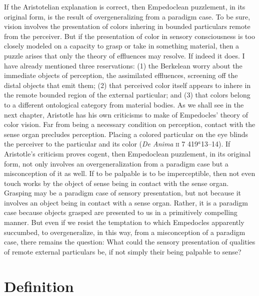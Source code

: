 If the Aristotelian explanation is correct, then Empedoclean puzzlement, in its original form, is the result of overgeneralizing from a paradigm case. To be sure, vision involves the presentation of colors inhering in bounded particulars remote from the perceiver. But if the presentation of color in sensory consciousness is too closely modeled on a capacity to grasp or take in something material, then a puzzle arises that only the theory of effluences may resolve. If indeed it does. I have already mentioned three reservations: (1) the Berkelean worry about the immediate objects of perception, the assimilated effluences, screening off the distal objects that emit them; (2) that perceived color itself appears to inhere in the remote bounded region of the external particular; and (3) that colors belong to a different ontological category from material bodies. As we shall see in the next chapter, Aristotle has his own criticisms to make of Empedocles' theory of color vision. Far from being a necessary condition on perception, contact with the sense organ precludes perception. Placing a colored particular on the eye blinds the perceiver to the particular and its color (\emph{De Anima} \textsc{ii} 7 419\( ^{a} \)13--14). If Aristotle's criticism proves cogent, then Empedoclean puzzlement, in its original form, not only involves an overgeneralization from a paradigm case but a misconception of it as well. If to be palpable is to be imperceptible, then not even touch works by the object of sense being in contact with the sense organ. Grasping may be a paradigm case of sensory presentation, but not because it involves an object being in contact with a sense organ. Rather, it is a paradigm case because objects grasped are presented to us in a primitively compelling manner. But even if we resist the temptation to which Empedocles apparently succumbed, to overgeneralize, in this way, from a misconception of a paradigm case, there remains the question: What could the sensory presentation of qualities of remote external particulars be, if not simply their being palpable to sense?


\section{Definition} %
\label{sec:definition}

